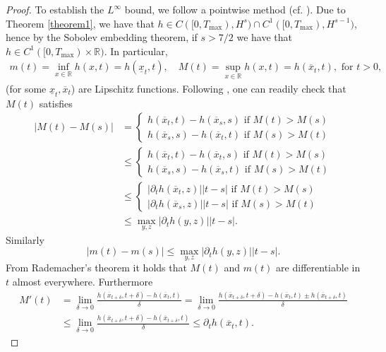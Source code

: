 \documentclass[final,11pt,a4paper,reqno]{amsart}
\newcommand{\RR}{\mathbb R}
\theoremstyle{definition}
\begin{document}
\begin{proof}
To establish the $L^{\infty}$ bound, we follow a pointwise method (cf. \cite{Constantin-Escher-98, Cordoba-Cordoba-04}). {Due to Theorem \ref{theorem1}, we have that $h \in C([0,T_{\max}), H^{s})\cap C^{1}([0, T_{\max}),H^{s-1})$, hence by the Sobolev embedding theorem, if $s>7/2$ we have that $h \in C^{1}([0,T_{\max})\times \RR)$.} In particular, 
\begin{align*}
m(t)=\displaystyle\inf_{x\in\RR}h(x,t)=h(\underline{x}_{t},t), \quad M(t)= \displaystyle\sup_{x\in\RR}h(x,t)=h(\overline{x}_{t},t) , \mbox{ for } t>0,
\end{align*}
(for some $\underline{x}_{t}, \overline{x}_{t}$)
are Lipschitz functions. Following \cite{ Cordoba-Cordoba-04}, one can readily check that $M(t)$ satisfies
\begin{align*}
\left|M(t)-M(s)\right|&=\left\{\begin{array}{cc}h(\overline{x}_t,t)-h(\overline{x}_s,s) \text{ if } M(t)>M(s)\\
h(\overline{x}_s,s)-h(\overline{x}_t,t) \text{ if }M(s)>M(t)\end{array}\right.
\\
&\leq \left\{\begin{array}{cc}h(\overline{x}_t,t)-h(\overline{x}_t,s) \text{ if } M(t)>M(s)\\
h(\overline{x}_s,s)-h(\overline{x}_s,t) \text{ if }M(s)>M(t)\end{array}\right.
\\
&\leq \left\{\begin{array}{cc}|\partial_t h(\overline{x}_t,z)||t-s| \text{ if } M(t)>M(s)\\
|\partial_t h(\overline{x}_s,z)||t-s| \text{ if }M(s)>M(t)\end{array}\right.
\\
&\leq \max_{y,z}|\partial_t h(y,z)||t-s|.
\end{align*}
Similarly
$$
\left|m(t)-m(s)\right|\leq \max_{y,z}|\partial_t h(y,z)||t-s|.
$$
From Rademacher's theorem it holds that $M(t)$ and $m(t)$ are differentiable in $t$ almost everywhere. Furthermore
\begin{align*}
M'(t)&=\lim_{\delta\rightarrow0} \frac{h(\overline{x}_{t+\delta},t+\delta)-h(\overline{x}_t,t)}{\delta}=\lim_{\delta\rightarrow0} \frac{h(\overline{x}_{t+\delta},t+\delta)-h(\overline{x}_t,t)\pm h(\overline{x}_{t+\delta},t)}{\delta}\\
&\leq\lim_{\delta\rightarrow0} \frac{h(\overline{x}_{t+\delta},t+\delta)-h(\overline{x}_{t+\delta},t)}{\delta}\leq \partial_t h(\overline{x}_{t},t).

\end{align*}
\end{proof}
\end{document}
